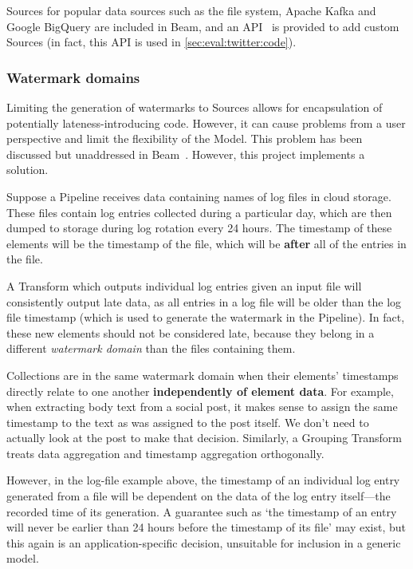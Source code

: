 Sources for popular data sources such as the file system, Apache Kafka and Google BigQuery are included in Beam, and an API~\cite{BEAM-code-SourceAPI} is provided to add custom Sources (in fact, this API is used in \cref{sec:eval:twitter:code}).

\subsubsection{Watermark domains}

Limiting the generation of watermarks to Sources allows for encapsulation of potentially lateness-introducing code.
However, it can cause problems from a user perspective and limit the flexibility of the Model.
This problem has been discussed but unaddressed in Beam~\cite{Beam-JIRA-watermark-domains}.
However, this project implements a solution.

Suppose a Pipeline receives data containing names of log files in cloud storage.
These files contain log entries collected during a particular day, which are then dumped to storage during log rotation every 24 hours.
The timestamp of these elements will be the timestamp of the file, which will be \textbf{after} all of the entries in the file.

A Transform which outputs individual log entries given an input file will consistently output late data, as all entries in a log file will be older than the log file timestamp (which is used to generate the watermark in the Pipeline).
In fact, these new elements should not be considered late, because they belong in a different \emph{watermark domain} than the files containing them.

Collections are in the same watermark domain when their elements' timestamps directly relate to one another \textbf{independently of element data}.
For example, when extracting body text from a social post, it makes sense to assign the same timestamp to the text as was assigned to the post itself.
We don't need to actually look at the post to make that decision.
Similarly, a Grouping Transform treats data aggregation and timestamp aggregation orthogonally.

However, in the log-file example above, the timestamp of an individual log entry generated from a file will be dependent on the data of the log entry itself---the recorded time of its generation.
A guarantee such as `the timestamp of an entry will never be earlier than 24 hours before the timestamp of its file' may exist, but this again is an application-specific decision, unsuitable for inclusion in a generic model.


